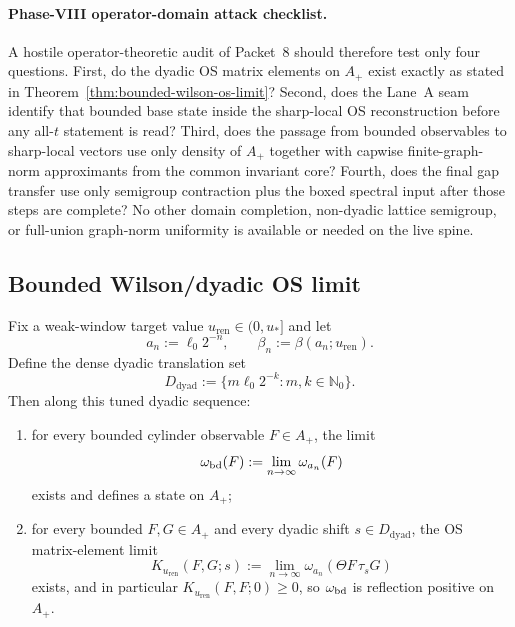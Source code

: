 \paragraph{Phase-VIII operator-domain attack checklist.}
A hostile operator-theoretic audit of Packet~8 should therefore test only four questions. First, do the dyadic OS matrix elements on $A_+$ exist exactly as stated in Theorem~\ref{thm:bounded-wilson-os-limit}? Second, does the Lane~A seam identify that bounded base state inside the sharp-local OS reconstruction before any all-$t$ statement is read? Third, does the passage from bounded observables to sharp-local vectors use only density of $A_+$ together with capwise finite-graph-norm approximants from the common invariant core? Fourth, does the final gap transfer use only semigroup contraction plus the boxed spectral input after those steps are complete? No other domain completion, non-dyadic lattice semigroup, or full-union graph-norm uniformity is available or needed on the live spine.


\subsection{Bounded Wilson/dyadic OS limit}

\begin{theorem}\label{thm:bounded-wilson-os-limit}
Fix a weak-window target value $u_{\mathrm{ren}}\in(0,u_*]$ and let
\[
a_n:=\ell_0 2^{-n},\qquad \beta_n:=\beta(a_n;u_{\mathrm{ren}}).
\]
Define the dense dyadic translation set
\[
D_{\mathrm{dyad}}:=\{m\ell_0 2^{-k}:m,k\in\mathbb N_0\}.
\]
Then along this tuned dyadic sequence:
\begin{enumerate}[label=\textup{(\roman*)},leftmargin=2.25em]
\item for every bounded cylinder observable $F\in A_+$, the limit
\[
\omega_{\mathrm{bd}}(F):=\lim_{n\to\infty}\omega_{a_n}(F)
\]
exists and defines a state on $A_+$;
\item for every bounded $F,G\in A_+$ and every dyadic shift $s\in D_{\mathrm{dyad}}$, the OS matrix-element limit
\[
K_{u_{\mathrm{ren}}}(F,G;s):=\lim_{n\to\infty}\omega_{a_n}(\Theta F\,\tau_s G)
\]
exists, and in particular $K_{u_{\mathrm{ren}}}(F,F;0)\ge 0$, so $\omega_{\mathrm{bd}}$ is reflection positive on $A_+$.
\end{enumerate}
\end{theorem}

